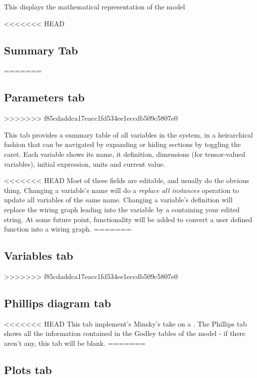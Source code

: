 \label{tabs:Equations}

This displays the mathematical representation of the model

<<<<<<< HEAD
\subsection{Summary Tab}\label{tabs:Summary}
=======
\subsection{Parameters tab}

\label{tabs:Parameters}
>>>>>>> f85cdaddca17eacc1fd534ee1eccdb509c5807e0

This tab provides a summary table of all variables in the system, in a
heirarchical fashion that can be navigated by expanding or hiding
sections by toggling the caret. Each variable shows its name, it
definition, dimensions (for tensor-valued variables), initial
expression, units and current value.

<<<<<<< HEAD
Most of these fields are editable, and usually do the obvious
thing. Changing a variable's name will do a {\em replace all
  instances} operation to update all variables of the same
name. Changing a variable's definition will replace the wiring graph
leading into the variable by a  containing your
edited string. At some future point, functionality will be added to
convert a user defined function into a wiring graph.
=======
\subsection{Variables tab}

\label{tabs:Variables}
>>>>>>> f85cdaddca17eacc1fd534ee1eccdb509c5807e0

\subsection{Phillips diagram tab}\label{tabs:Phillips}

<<<<<<< HEAD
This tab implement's Minsky's take on a . The
Phillips tab shows all the information contained in the Godley tables
of the model - if there aren't any, this tab will be blank.
=======
\subsection{Plots tab}

